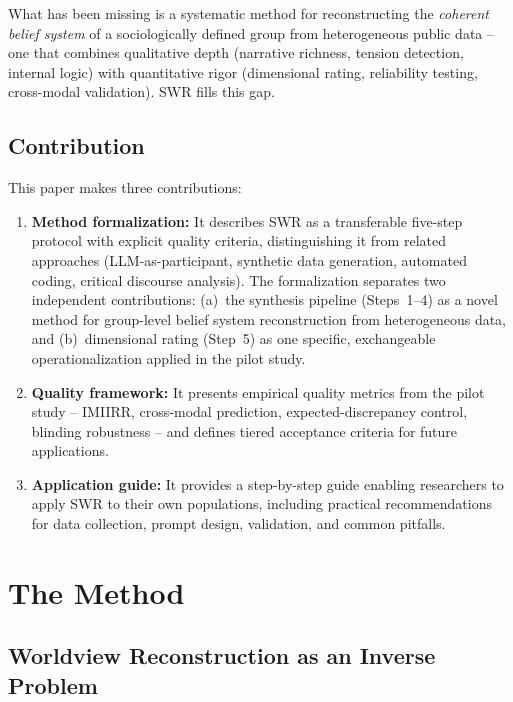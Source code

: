 \documentclass[11pt,a4paper]{article}
\begin{document}
What has been missing is a systematic method for reconstructing the \emph{coherent belief system} of a sociologically defined group from heterogeneous public data -- one that combines qualitative depth (narrative richness, tension detection, internal logic) with quantitative rigor (dimensional rating, reliability testing, cross-modal validation). SWR fills this gap.


\subsection{Contribution}
\label{sec:intro:contribution}

This paper makes three contributions:

\begin{enumerate}[nosep]
  \item \textbf{Method formalization:} It describes SWR as a transferable five-step protocol with explicit quality criteria, distinguishing it from related approaches (LLM-as-participant, synthetic data generation, automated coding, critical discourse analysis). The formalization separates two independent contributions: (a)~the synthesis pipeline (Steps~1--4) as a novel method for group-level belief system reconstruction from heterogeneous data, and (b)~dimensional rating (Step~5) as one specific, exchangeable operationalization applied in the pilot study.
  \item \textbf{Quality framework:} It presents empirical quality metrics from the pilot study -- IMIIRR, cross-modal prediction, expected-discrepancy control, blinding robustness -- and defines tiered acceptance criteria for future applications.
  \item \textbf{Application guide:} It provides a step-by-step guide enabling researchers to apply SWR to their own populations, including practical recommendations for data collection, prompt design, validation, and common pitfalls.
\end{enumerate}


\section{The Method}
\label{sec:method}

\subsection{Worldview Reconstruction as an Inverse Problem}
\label{sec:method:inverse}
\end{document}
